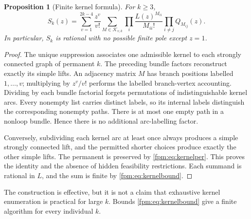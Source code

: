 \documentclass[11pt]{article}
\newtheorem{proposition}[theorem]{Proposition}
\theoremstyle{definition}\newtheorem{definition}[theorem]{Definition}
\theoremstyle{remark}\newtheorem{remark}[theorem]{Remark}
\begin{document}
\begin{proposition}[Finite kernel formula]\label{fpm:prop:kernel}
For $k\ge3$,
\begin{equation}\label{fpm:eq:kernel}
 S_k(z)=\sum_{v=1}^{2k-4}\frac{z^v}{v!}
 \sum_{M\in\mathcal K_{v,k}}
 \prod_i\frac{L(z)^{M_{ii}}}{M_{ii}!}
 \prod_{i\ne j}Q_{M_{ij}}(z).
\end{equation}
In particular, $S_k$ is rational with no possible finite pole except $z=1$.
\end{proposition}
\begin{proof}
The unique suppression associates one admissible kernel to each strongly connected graph of permanent $k$. The preceding bundle factors reconstruct exactly its simple lifts. An adjacency matrix $M$ has branch positions labelled $1,\ldots,v$; multiplying by $z^v/v!$ performs the labelled branch-vertex accounting. Dividing by each bundle factorial forgets permutations of indistinguishable kernel arcs. Every nonempty list carries distinct labels, so its internal labels distinguish the corresponding nonempty paths. There is at most one empty path in a nonloop bundle. Hence there is no additional arc-labelling factor.

Conversely, subdividing each kernel arc at least once always produces a simple strongly connected lift, and the permitted shorter choices produce exactly the other simple lifts. The permanent is preserved by \eqref{fpm:eq:kernelper}. This proves the identity and the absence of hidden feasibility restrictions. Each summand is rational in $L$, and the sum is finite by \eqref{fpm:eq:kernelbound}.
\end{proof}

The construction is effective, but it is not a claim that exhaustive kernel enumeration is practical for large $k$. Bounds \eqref{fpm:eq:kernelbound} give a finite algorithm for every individual $k$.
\end{document}
